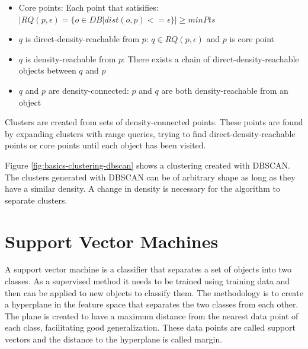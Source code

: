 \documentclass[pdftex,12pt,a4paper]{report}
\begin{document}
\begin{itemize}
	\item
	Core points: Each point that satisifies: \\$|RQ(p, \epsilon) = \{  o \in DB | dist(o,p) <= \epsilon  \}| \geq minPts$
	
	 \item
	 $q$ is direct-density-reachable from $p$: $q \in RQ(p, \epsilon)$ and $p$ is core point
	 
	 \item
	 $q$ is density-reachable from $p$: There exists a chain of direct-density-reachable objects between $q$ and $p$
	 
	 \item
	 $q$ and $p$ are density-connected: $p$ and $q$ are both density-reachable from an object
\end{itemize}

Clusters are created from sets of density-connected points. These points are found by expanding clusters with range queries, trying to find direct-density-reachable points or core points until each object has been visited.

Figure \ref{fig:basics-clustering-dbscan} shows a clustering created with DBSCAN. The clusters generated with DBSCAN can be of arbitrary shape as long as they have a similar density. A change in density is necessary for the algorithm to separate clusters. 

\section{Support Vector Machines}

A support vector machine is a classifier that separates a set of objects into two classes. As a supervised method it needs to be trained using training data and then can be applied to new objects to classify them. The methodology is to create a hyperplane in the feature space that separates the two classes from each other. The plane is created to have a maximum distance from the nearest data point of each class, facilitating good generalization. These data points are called support vectors and the distance to the hyperplane is called margin.
\end{document}
